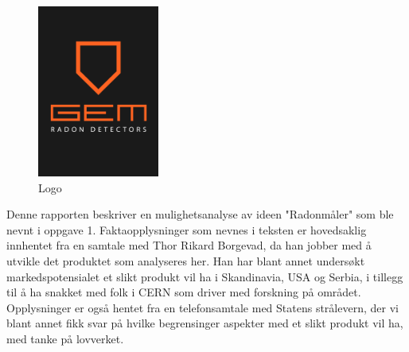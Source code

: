 \begin{figure}[ht!]
    \centering
    \includegraphics[width=40mm]{gem-radon-detectors.jpg}
    \caption{Logo}
    \label{fig:logo}
\end{figure}
Denne rapporten beskriver en mulighetsanalyse av ideen "Radonmåler" som ble nevnt i oppgave 1.
Faktaopplysninger som nevnes i teksten er hovedsaklig innhentet fra en samtale med Thor Rikard Borgevad, da han jobber med å utvikle det produktet som analyseres her. Han har blant annet undersøkt markedspotensialet et slikt produkt vil ha i Skandinavia, USA og Serbia, i tillegg til å ha snakket med folk i CERN som driver med forskning på området.
Opplysninger er også hentet fra en telefonsamtale med Statens strålevern, der vi blant annet fikk svar på hvilke begrensinger aspekter med et slikt produkt vil ha, med tanke på lovverket.  
